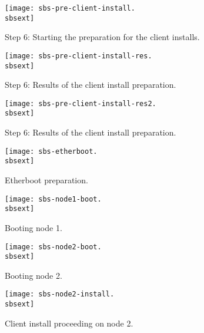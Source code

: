 \begin{figure}[htbp]
  \begin{center}
    \texttt{[image: sbs-pre-client-install.\\sbsext]}
    \caption{Step 6: Starting the preparation for the client installs.}
    \label{fig:sbs-pre-client-install}
  \end{center}
\end{figure}

\begin{figure}[htbp]
  \begin{center}
    \texttt{[image: sbs-pre-client-install-res.\\sbsext]}
    \caption{Step 6: Results of the client install preparation.}
    \label{fig:sbs-pre-client-install-res}
  \end{center}
\end{figure}

\begin{figure}[htbp]
  \begin{center}
    \texttt{[image: sbs-pre-client-install-res2.\\sbsext]}
    \caption{Step 6: Results of the client install preparation.}
    \label{fig:sbs-pre-client-install-res2}
  \end{center}
\end{figure}

\begin{figure}[htbp]
  \begin{center}
    \texttt{[image: sbs-etherboot.\\sbsext]}
    \caption{Etherboot preparation.}
    \label{fig:sbs-etherboot}
  \end{center}
\end{figure}

\begin{figure}[htbp]
  \begin{center}
    \texttt{[image: sbs-node1-boot.\\sbsext]}
    \caption{Booting node 1.}
    \label{fig:sbs-node1-boot}
  \end{center}
\end{figure}

\begin{figure}[htbp]
  \begin{center}
    \texttt{[image: sbs-node2-boot.\\sbsext]}
    \caption{Booting node 2.}
    \label{fig:sbs-node2-boot}
  \end{center}
\end{figure}

\begin{figure}[htbp]
  \begin{center}
    \texttt{[image: sbs-node2-install.\\sbsext]}
    \caption{Client install proceeding on node 2.}
    \label{fig:sbs-node2-install}
  \end{center}
\end{figure}

